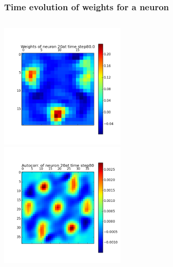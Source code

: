 \begin{frame}
\frametitle{Time evolution of weights for a neuron}
\begin{columns}[t]
\centering
\includegraphics[width=6cm,height=6cm]{neurons/neuron_w_20_t_80.png}\\
\centering
\includegraphics[width=6cm,height=6cm]{neurons/neuron_a_20_t_80.png}\\
\end{columns}
\end{frame}

